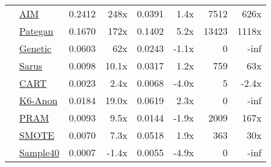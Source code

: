 \begin{table}
\begin{tabular}{llr@{\hskip 6pt}r@{\hskip 14pt}r@{\hskip 6pt}r@{\hskip 14pt}rr}
        \cellcolor{ForestGreen} & \href{https://htmlpreview.github.io/?https://github.com/yoid2000/sdnist-summary/blob/main/results/aim_e_10_all/report.html}{AIM} & 0.2412 & 248x & 0.0391 & 1.4x & 7512 & 626x \\
        \cellcolor{ForestGreen} & \href{https://htmlpreview.github.io/?https://github.com/yoid2000/sdnist-summary/blob/main/results/pategan_n_iter_50_e_10_all/report.html}{Pategan} & 0.1670 & 172x & 0.1402 & 5.2x & 13423 & 1118x \\
        \cellcolor{YellowGreen} & \href{https://htmlpreview.github.io/?https://github.com/yoid2000/sdnist-summary/blob/main/results/genetic_sd_e_10_simple/report.html}{Genetic} & 0.0603 & 62x & 0.0243 & -1.1x & 0 & -inf \\
        \cellcolor{YellowGreen} & \href{https://htmlpreview.github.io/?https://github.com/yoid2000/sdnist-summary/blob/main/results/sarus_sdg_demographic/report.html}{Sarus} & 0.0098 & 10.1x & 0.0317 & 1.2x & 759 & 63x \\
        \cellcolor{SkyBlue} & \href{https://htmlpreview.github.io/?https://github.com/yoid2000/sdnist-summary/blob/main/results/cart_cf21/report.html}{CART} & 0.0023 & 2.4x & 0.0068 & -4.0x & 5 & -2.4x \\
        \cellcolor{Salmon} & \href{https://htmlpreview.github.io/?https://github.com/yoid2000/sdnist-summary/blob/main/results/k_anonymity_k_6/report.html}{K6-Anon} & 0.0184 & 19.0x & 0.0619 & 2.3x & 0 & -inf \\
        \cellcolor{Goldenrod} & \href{https://htmlpreview.github.io/?https://github.com/yoid2000/sdnist-summary/blob/main/results/pram_default/report.html}{PRAM} & 0.0093 & 9.5x & 0.0144 & -1.9x & 2009 & 167x \\
        \cellcolor{Tan} & \href{https://htmlpreview.github.io/?https://github.com/yoid2000/sdnist-summary/blob/main/results/smote_target_marital/report.html}{SMOTE} & 0.0070 & 7.3x & 0.0518 & 1.9x & 363 & 30x \\
        \cellcolor{Tan} & \href{https://htmlpreview.github.io/?https://github.com/yoid2000/sdnist-summary/blob/main/results/subsample_40pcnt_all/report.html}{Sample40} & 0.0007 & -1.4x & 0.0055 & -4.9x & 0 & -inf \\
        \bottomrule
    \end{tabular}
\end{table}
